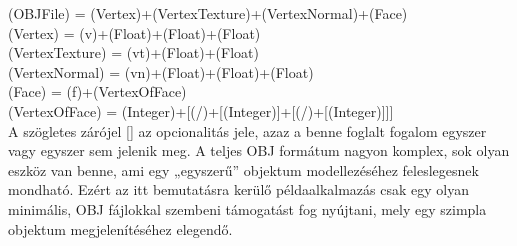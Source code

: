 \noindent(OBJFile) = {(Vertex)}+{(VertexTexture)}+{(VertexNormal)}+{(Face)}\\
(Vertex) = (v)+(Float)+(Float)+(Float)\\
(VertexTexture) = (vt)+(Float)+(Float)\\
(VertexNormal) = (vn)+(Float)+(Float)+(Float)\\
(Face) = (f)+{(VertexOfFace)}\\
(VertexOfFace) = (Integer)+[(/)+[(Integer)]+[(/)+[(Integer)]]]\\

A szögletes zárójel [] az opcionalitás jele, azaz a benne foglalt fogalom egyszer vagy egyszer sem jelenik meg. A teljes OBJ formátum nagyon komplex, sok olyan eszköz van benne, ami egy „egyszerű” objektum modellezéséhez feleslegesnek mondható. Ezért az itt bemutatásra kerülő példaalkalmazás csak egy olyan minimális, OBJ fájlokkal szembeni támogatást fog nyújtani, mely egy szimpla objektum megjelenítéséhez elegendő.
